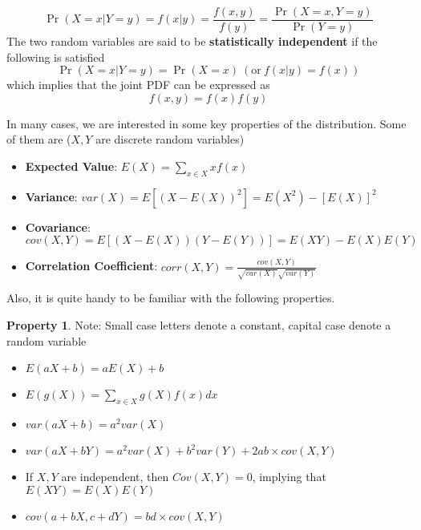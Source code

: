 \documentclass[12pt]{article}
\theoremstyle{definition}
\theoremstyle{property}
\newtheorem{property}{Property}[section]
\theoremstyle{assumption}
\theoremstyle{example}
\theoremstyle{comment}
\begin{document}
\[
\Pr(X=x|Y=y)=f(x|y)=\frac{f(x,y)}{f(y)}=\frac{\Pr(X=x, Y=y)}{\Pr(Y=y)}
\] 
The two random variables are said to be \textbf{statistically independent} if the following is satisfied
\[
\Pr(X=x|Y=y)=\Pr(X=x)\ (\text{or}\ f(x|y)=f(x))
\]
which implies that the joint PDF can be expressed as
\[
f(x,y)=f(x)f(y)
\] \par\medskip
In many cases, we are interested in some key properties of the distribution. Some of them are ($X,Y$ are discrete random variables) \\
\begin{itemize}
\item \textbf{Expected Value}: $E(X)=\sum_{x\in X} xf(x)$
\item \textbf{Variance}: $var(X)=E[(X-E(X))^2]=E(X^2)-[E(X)]^2$
\item \textbf{Covariance}: $cov(X,Y)=E[(X-E(X))(Y-E(Y))]=E(XY)-E(X)E(Y)$
\item \textbf{Correlation Coefficient}: $corr(X,Y)=\frac{cov(X,Y)}{\sqrt{var(X)}\sqrt{var(Y)}}$
\end{itemize}  \par\medskip\medskip
Also, it is quite handy to be familiar with the following properties.\\
\begin{mdframed}[backgroundcolor=blue!5] 
\begin{property}
Note: Small case letters denote a constant, capital case denote a random variable
\begin{itemize}
\item $E(aX+b) = aE(X)+b$
\item $E(g(X))=\sum_{x\in X}g(X)f(x)dx$
\item $var(aX+b)=a^2var(X)$
\item $var(aX+bY)=a^2var(X)+b^2var(Y)+2ab\times cov(X,Y)$
\item If $X,Y$ are independent, then $Cov(X,Y) =0$, implying that $E(XY)=E(X)E(Y)$
\item $cov(a+bX, c+dY)=bd\times cov(X,Y)$ 
\end{itemize} \par\medskip
\end{property}
\end{mdframed}
\end{document}
